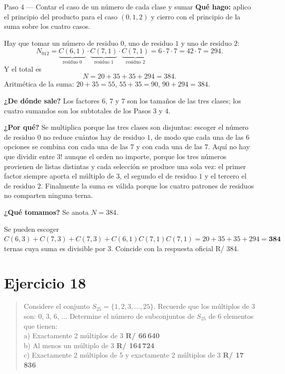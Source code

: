 \documentclass[11pt]{article}
\begin{document}
\begin{paso}{Paso 4 --- Contar el caso de un número de cada clase y sumar}
\textbf{Qué hago:} aplico el principio del producto para el caso $(0,1,2)$ y cierro con el principio de la suma sobre los cuatro casos.

Hay que tomar un número de residuo $0$, uno de residuo $1$ y uno de residuo $2$:
\[
  N_{012}=\underbrace{C(6,1)}_{\text{residuo }0}\cdot\underbrace{C(7,1)}_{\text{residuo }1}\cdot\underbrace{C(7,1)}_{\text{residuo }2}=6\cdot 7\cdot 7 = 42\cdot 7 = 294 .
\]
Y el total es
\[
  N = 20+35+35+294 = 384 .
\]
Aritmética de la suma: $20+35=55$, $55+35=90$, $90+294=384$.

\textbf{¿De dónde sale?} Los factores $6$, $7$ y $7$ son los tamaños de las tres clases; los cuatro sumandos son los subtotales de los Pasos 3 y 4.

\textbf{¿Por qué?} Se multiplica porque las tres clases son disjuntas: escoger el número de residuo $0$ no reduce cuántos hay de residuo $1$, de modo que cada una de las $6$ opciones se combina con cada una de las $7$ y con cada una de las $7$. Aquí no hay que dividir entre $3!$ aunque el orden no importe, porque los tres números provienen de listas distintas y cada selección se produce una sola vez: el primer factor siempre aporta el múltiplo de $3$, el segundo el de residuo $1$ y el tercero el de residuo $2$. Finalmente la suma es válida porque los cuatro patrones de residuos no comparten ninguna terna.

\textbf{¿Qué tomamos?} Se anota $N=384$.
\end{paso}

\begin{resp}
Se pueden escoger $C(6,3)+C(7,3)+C(7,3)+C(6,1)C(7,1)C(7,1)=20+35+35+294=\mathbf{384}$ ternas cuya suma es divisible por $3$. Coincide con la respuesta oficial R/ 384.
\end{resp}

\section*{Ejercicio 18}

\begin{quote}
Considere el conjunto $S_{25}=\{1,2,3,\dots,25\}$. Recuerde que los múltiplos de 3 son: 0, 3, 6, $\dots$ Determine el número de subconjuntos de $S_{25}$ de 6 elementos que tienen:\\[2pt]
a) Exactamente 2 múltiplos de 3 \quad \textbf{R/ 66\,640}\\
b) Al menos un múltiplo de 3 \quad \textbf{R/ 164\,724}\\
c) Exactamente 2 múltiplos de 5 y exactamente 2 múltiplos de 3 \quad \textbf{R/ 17\,836}
\end{quote}
\end{document}
